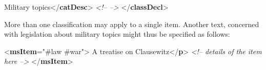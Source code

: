 \begin{shaded}
\hspace*{1em}\hspace*{1em}Military topics{</\textbf{catDesc}>}\mbox{}\newline 
\hspace*{1em}\mbox{}\newline 
\textit{<!-- -->}\mbox{}\newline 
{}\mbox{}\newline 
{</\textbf{classDecl}>}\end{shaded}\egroup\par \noindent  More than one classification may apply to a single item. Another text, concerned with legislation about military topics might thus be specified as follows: \par\bgroup{}\exampleFont \begin{shaded}\noindent\mbox{}{<\textbf{msItem}\hspace*{1em}{class}="{\#law \#war}">}\mbox{}\newline 
{}A treatise on Clausewitz{</\textbf{p}>}\mbox{}\newline 
\textit{<!-- details of the item here -->}\mbox{}\newline 
{</\textbf{msItem}>}\end{shaded}\egroup\par 
